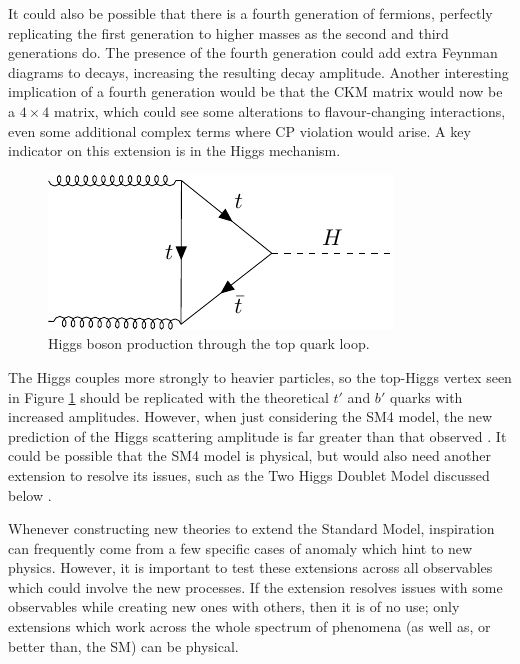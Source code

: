 \documentclass[a4paper,12pt]{article}
\begin{document}
It could also be possible that there is a fourth generation of fermions, perfectly replicating the first generation to higher masses as the second and third generations do. 
The presence of the fourth generation could add extra Feynman diagrams to decays, increasing the resulting decay amplitude. 
Another interesting implication of a fourth generation would be that the CKM matrix would now be a $4\times4$ matrix, which could see some alterations to flavour-changing interactions, even some additional complex terms where CP violation would arise. 
A key indicator on this extension is in the Higgs mechanism. 
\begin{figure}[H]
    \centering
    \includegraphics{../notes/higgs.pdf}
    \caption{\label{fig:higgs} Higgs boson production through the top quark loop.}
\end{figure}
The Higgs couples more strongly to heavier particles, so the top-Higgs vertex seen in Figure \ref{fig:higgs} should be replicated with the theoretical $t'$ and $b'$ quarks with increased amplitudes. 
However, when just considering the SM4 model, the new prediction of the Higgs scattering amplitude is far greater than that observed \cite{sm4}. 
It could be possible that the SM4 model is physical, but would also need another extension to resolve its issues, such as the Two Higgs Doublet Model discussed below \cite{shal}. 

Whenever constructing new theories to extend the Standard Model, inspiration can frequently come from a few specific cases of anomaly which hint to new physics. 
However, it is important to test these extensions across all observables which could involve the new processes.
If the extension resolves issues with some observables while creating new ones with others, then it is of no use; only extensions which work across the whole spectrum of phenomena (as well as, or better than, the SM) can be physical. 
\end{document}
